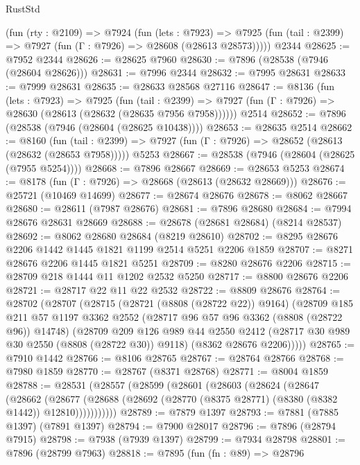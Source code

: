 \begin{lexlean}{RustStd}
\begin{coremodule}
    (fun (rty : @2109) =>
    @7924
      (fun (lets : @7923) =>
      @7925 (fun (tail : @2399) => @7927 (fun (Γ : @7926) => @28608 (@28613 @28573)))))
    @2344
@28625 := @7952 @2344
@28626 := @28625 @7960
@28630 := @7896 (@28538 (@7946 (@28604 @28626)))
@28631 := @7996 @2344
@28632 := @7995 @28631
@28633 := @7999 @28631
@28635 := @28633 @28568 @27116
@28647 := @8136
    (fun (lets : @7923) =>
    @7925
      (fun (tail : @2399) =>
      @7927 (fun (Γ : @7926) => @28630 (@28613 (@28632 (@28635 @7956 @7958))))))
    @2514
@28652 := @7896 (@28538 (@7946 (@28604 (@28625 @10438))))
@28653 := @28635 @2514
@28662 := @8160
    (fun (tail : @2399) => @7927 (fun (Γ : @7926) => @28652 (@28613 (@28632 (@28653 @7958)))))
    @5253
@28667 := @28538 (@7946 (@28604 (@28625 (@7955 @5254))))
@28668 := @7896 @28667
@28669 := @28653 @5253
@28674 := @8178 (fun (Γ : @7926) => @28668 (@28613 (@28632 @28669)))
@28676 := @25721 (@10469 @14699)
@28677 := @28674 @28676
@28678 := @8062 @28667
@28680 := @28611 (@7987 @28676)
@28681 := @7896 @28680
@28684 := @7994 @28676 @28631 @28669
@28688 := @28678 (@28681 @28684) (@8214 @28537)
@28692 := @8062 @28680 @28684 (@8219 @28610)
@28702 := @8295 @28676 @2206 @1442 @1445 @1821 @1199 @2514 @5251 @2206 @1859
@28707 := @8271 @28676 @2206 @1445 @1821 @5251
@28709 := @8280 @28676 @2206
@28715 := @28709 @218 @1444 @11 @1202 @2532 @5250
@28717 := @8800 @28676 @2206
@28721 := @28717 @22 @11 @22 @2532
@28722 := @8809 @28676
@28764 := @28702
    (@28707
      (@28715
        (@28721 (@8808 (@28722 @22)) @9164)
        (@28709
          @185
          @211
          @57
          @1197
          @3362
          @2552
          (@28717 @96 @57 @96 @3362 (@8808 (@28722 @96)) @14748)
          (@28709
            @209
            @126
            @989
            @44
            @2550
            @2412
            (@28717 @30 @989 @30 @2550 (@8808 (@28722 @30)) @9118)
            (@8362 @28676 @2206)))))
@28765 := @7910 @1442
@28766 := @8106 @28765
@28767 := @28764 @28766
@28768 := @7980 @1859
@28770 := @28767 (@8371 @28768)
@28771 := @8004 @1859
@28788 := @28531
    (@28557
      (@28599
        (@28601
          (@28603
            (@28624
              (@28647
                (@28662
                  (@28677
                    (@28688 (@28692 (@28770 (@8375 @28771) (@8380 (@8382 @1442)) @12810)))))))))))
@28789 := @7879 @1397
@28793 := @7881 (@7885 @1397) (@7891 @1397)
@28794 := @7900 @28017
@28796 := @7896 (@28794 @7915)
@28798 := @7938 (@7939 @1397)
@28799 := @7934 @28798
@28801 := @7896 (@28799 @7963)
@28818 := @7895
    (fun (fn : @89) =>
    @28796

\end{coremodule}
\end{lexlean}
